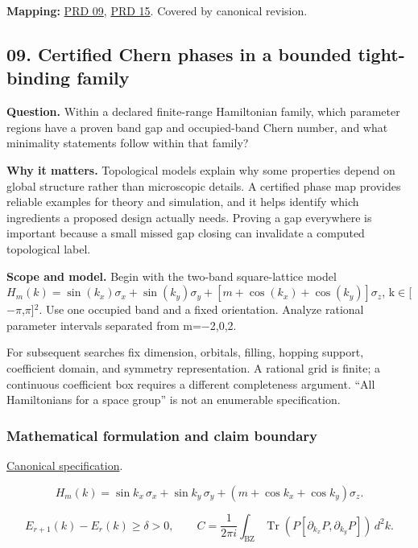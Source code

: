 \documentclass[
  11pt,
]{article}
\begin{document}
\textbf{Mapping:}
\href{https://github.com/rick-stevens-ai/Pure-Thought/blob/main/PRDs/09-Topological-Band-Theory.md}{PRD
09},
\href{https://github.com/rick-stevens-ai/Pure-Thought/blob/main/PRDs/15-Topological-Quantum-Chemistry.md}{PRD
15}. Covered by canonical revision.

\subsection{09. Certified Chern phases in a bounded tight-binding
family}

\textbf{Question.} Within a declared finite-range Hamiltonian family,
which parameter regions have a proven band gap and occupied-band Chern
number, and what minimality statements follow within that family?

\textbf{Why it matters.} Topological models explain why some properties
depend on global structure rather than microscopic details. A certified
phase map provides reliable examples for theory and simulation, and it
helps identify which ingredients a proposed design actually needs.
Proving a gap everywhere is important because a small missed gap closing
can invalidate a computed topological label.

\textbf{Scope and model.} Begin with the two-band square-lattice model
\(H_m(k)=\sin(k_x)\sigma_x+\sin(k_y)\sigma_y+[m+\cos(k_x)+\cos(k_y)]\sigma_z\),
k\ensuremath{\in}[\ensuremath{-}\ensuremath{\pi},\ensuremath{\pi}]\ensuremath{{}^{2}}.
Use one occupied band and a fixed orientation. Analyze rational
parameter intervals separated from m=\ensuremath{-}2,0,2.

For subsequent searches fix dimension, orbitals, filling, hopping
support, coefficient domain, and symmetry representation. A rational
grid is finite; a continuous coefficient box requires a different
completeness argument. ``All Hamiltonians for a space group'' is not an
enumerable specification.

\subsubsection{Mathematical formulation and claim boundary}

\href{https://github.com/rick-stevens-ai/Pure-Thought/blob/main/PRDs/09-Topological-Band-Theory.md}{Canonical
specification}.

\[H_m(k)=\sin k_x\,\sigma_x+\sin k_y\,\sigma_y+
(m+\cos k_x+\cos k_y)\sigma_z.\]

\[E_{r+1}(k)-E_r(k)\ge\delta>0,\qquad
C=\frac{1}{2\pi i}\int_{\mathrm{BZ}}
\operatorname{Tr}\!\left(P[\partial_{k_x}P,\partial_{k_y}P]\right)\,d^2k.\]
\end{document}
